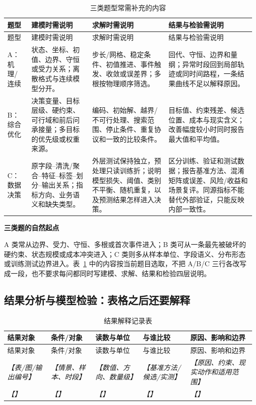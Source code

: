 \documentclass[UTF8,zihao=-4]{ctexart}
\newcommand{\slot}[1]{\textcolor{inkblue}{\textit{【#1】}}}
\newcommand{\guidehead}[1]{\par\medskip\noindent\textbf{\color{inkblue}#1}\par}
\begin{document}
\begin{longtable}{p{1.6cm}p{4.4cm}p{4.5cm}p{4.3cm}}
\caption{三类题型常需补充的内容}\label{tab:template-abc-slots}\\
\toprule
题型 & 建模时需说明 & 求解时需说明 & 结果与检验需说明\\
\midrule
\endfirsthead
\toprule
题型 & 建模时需说明 & 求解时需说明 & 结果与检验需说明\\
\midrule
\endhead
A：机理/连续 & 状态、坐标、初值、边界、守恒或受力关系；离散格式与连续模型分开。 & 步长/网格、稳定条件、初值推进、事件触发、收敛或误差界；多根按物理顺序筛选。 & 回代、守恒、边界和量纲；异常时段回到局部轨迹或同时间路程，一条结果曲线不足以解释原因。\\
B：综合优化 & 决策变量、目标层级、硬约束、可行域和前后问承接量；多目标的优先级或权重来源。 & 编码、初始解、越界/不可行处理、搜索范围、停止条件、重复协议和一致的比较条件。 & 目标值、约束残差、候选位置、成本与现实含义；改善幅度较小时同时报告最大值和平均值。\\
C：数据决策 & 原字段--清洗/聚合--特征--标签--划分--输出关系；指标方向、业务语义和缺失类型。 & 外层测试保持独立，预处理只读训练折；说明模型损失、阈值、类别不平衡、随机重复，以及预测结果怎样进入决策。 & 区分训练、验证和测试数据；报告基准方法、混淆矩阵或误差、风险/收益和场景复评。同源指标不能替代外部验证，只能反映内部一致性。\\
\bottomrule
\end{longtable}

\guidehead{三类题的自然起点}A 类常从边界、受力、守恒、多根或首次事件进入；B 类可从一条最先被破坏的硬约束、状态规模或成本冲突进入；C 类则多从样本单位、字段语义、分布形态或训练测试边界进入。表~\ref{tab:template-abc-slots} 中的内容按当前题目选取，不把 A/B/C 三行各改写成一段，也不要求每问都同时写建模、求解、结果和检验四层说明。


\subsection{结果分析与模型检验：表格之后还要解释}

\begin{longtable}{p{2.2cm}p{3.0cm}p{3.0cm}p{3.0cm}p{3.5cm}}
\caption{结果解释记录表}\label{tab:template-result-ledger}\\
\toprule
结果对象 & 条件/对象 & 读数与单位 & 与谁比较 & 原因、影响和边界\\
\midrule
\endfirsthead
\toprule
结果对象 & 条件/对象 & 读数与单位 & 与谁比较 & 原因、影响和边界\\
\midrule
\endhead
\slot{表/图/输出编号} & \slot{情景、样本、时段} & \slot{数值、方向、数量级} & \slot{基准方法/候选/实测} & \slot{原因、约束、现实动作和适用范围}\\
\slot{} & \slot{} & \slot{} & \slot{} & \slot{}\\
\bottomrule
\end{longtable}
\end{document}
